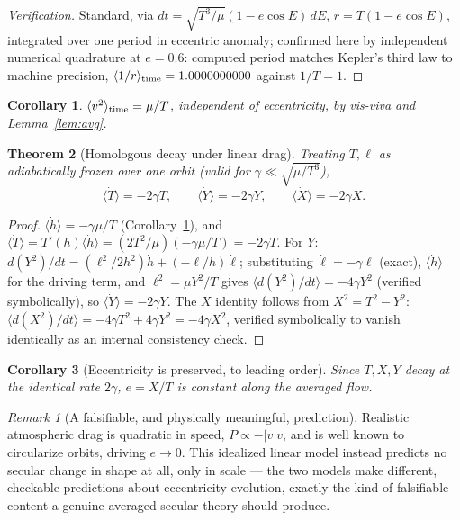 \documentclass[11pt]{amsart}
\newtheorem{theorem}{Theorem}[section]
\newtheorem{corollary}[theorem]{Corollary}
\theoremstyle{remark}
\newtheorem*{remark}{Remark}
\begin{document}
\begin{proof}[Verification]
Standard, via $dt=\sqrt{T^3/\mu}(1-e\cos E)\,dE$, $r=T(1-e\cos E)$, integrated over one period in eccentric anomaly; confirmed here by independent numerical quadrature at $e=0.6$: computed period matches Kepler's third law to machine precision, $\langle1/r\rangle_{\rm time}=1.0000000000$ against $1/T=1$.
\end{proof}

\begin{corollary}\label{cor:v2avg}
$\langle v^2\rangle_{\rm time}=\mu/T$, independent of eccentricity, by vis-viva and Lemma~\ref{lem:avg}.
\end{corollary}

\begin{theorem}[Homologous decay under linear drag]\label{thm:homologous}
Treating $T,\ell$ as adiabatically frozen over one orbit (valid for $\gamma\ll\sqrt{\mu/T^3}$),
\begin{equation}
\langle\dot T\rangle=-2\gamma T, \qquad \langle\dot Y\rangle=-2\gamma Y, \qquad \langle\dot X\rangle=-2\gamma X. \tag{5.2}
\end{equation}
\end{theorem}

\begin{proof}
$\langle\dot h\rangle=-\gamma\mu/T$ (Corollary~\ref{cor:v2avg}), and $\langle\dot T\rangle=T'(h)\langle\dot h\rangle=(2T^2/\mu)(-\gamma\mu/T)=-2\gamma T$. For $Y$: $d(Y^2)/dt=(\ell^2/2h^2)\dot h+(-\ell/h)\dot\ell$; substituting $\dot\ell=-\gamma\ell$ (exact), $\langle\dot h\rangle$ for the driving term, and $\ell^2=\mu Y^2/T$ gives $\langle d(Y^2)/dt\rangle=-4\gamma Y^2$ (verified symbolically), so $\langle\dot Y\rangle=-2\gamma Y$. The $X$ identity follows from $X^2=T^2-Y^2$: $\langle d(X^2)/dt\rangle=-4\gamma T^2+4\gamma Y^2=-4\gamma X^2$, verified symbolically to vanish identically as an internal consistency check.
\end{proof}

\begin{corollary}[Eccentricity is preserved, to leading order]\label{cor:ecc}
Since $T,X,Y$ decay at the identical rate $2\gamma$, $e=X/T$ is constant along the averaged flow.
\end{corollary}

\begin{remark}[A falsifiable, and physically meaningful, prediction]
Realistic atmospheric drag is quadratic in speed, $P\propto-|v|v$, and is well known to circularize orbits, driving $e\to0$. This idealized linear model instead predicts no secular change in shape at all, only in scale --- the two models make different, checkable predictions about eccentricity evolution, exactly the kind of falsifiable content a genuine averaged secular theory should produce.
\end{remark}
\end{document}

